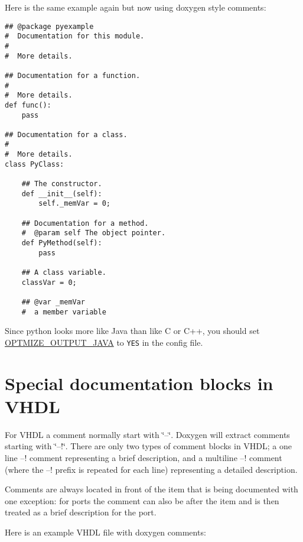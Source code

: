 Here is the same example again but now using doxygen style comments:



\begin{DocInclude}\begin{verbatim}## @package pyexample
#  Documentation for this module.
#
#  More details.

## Documentation for a function.
#
#  More details.
def func():
    pass

## Documentation for a class.
#
#  More details.
class PyClass:
   
    ## The constructor.
    def __init__(self):
        self._memVar = 0;
   
    ## Documentation for a method.
    #  @param self The object pointer.
    def PyMethod(self):
        pass
     
    ## A class variable.
    classVar = 0;

    ## @var _memVar
    #  a member variable
\end{verbatim}
\end{DocInclude}
 

Since python looks more like Java than like C or C++, you should set \hyperlink{config_cfg_optimize_output_java}{OPTMIZE\_\-OUTPUT\_\-JAVA} to {\tt YES} in the config file.

\hypertarget{docblocks_vhdlblocks}{}\section{Special documentation blocks in VHDL}\label{docblocks_vhdlblocks}
For VHDL a comment normally start with \char`\"{}--\char`\"{}. Doxygen will extract comments starting with \char`\"{}--!\char`\"{}. There are only two types of comment blocks in VHDL; a one line --! comment representing a brief description, and a multiline --! comment (where the --! prefix is repeated for each line) representing a detailed description.

Comments are always located in front of the item that is being documented with one exception: for ports the comment can also be after the item and is then treated as a brief description for the port.

Here is an example VHDL file with doxygen comments:



